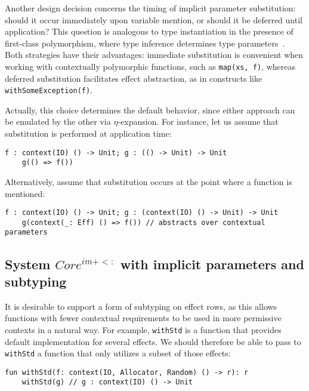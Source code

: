 \documentclass[acmsmall,review,screen]{acmart}
\begin{document}
Another design decision concerns the timing of implicit parameter substitution: should it occur immediately upon variable mention, or should it be deferred until application?
This question is analogous to type instantiation in the presence of first-class polymorphism, where type inference determines type parameters~\cite{emrich2020freezeml}. %
Both strategies have their advantages: immediate substitution is convenient when working with contextually polymorphic functions, such as \texttt{map(xs, f)}, whereas deferred substitution facilitates effect abstraction, as in constructs like \texttt{withSomeException(f)}. %

Actually, this choice determines the default behavior, since either approach can be emulated by the other via $\eta$-expansion.
For instance, let us assume that substitution is performed at application time:
\begin{lstlisting}[language=colang]
    f : context(IO) () -> Unit; g : (() -> Unit) -> Unit
    g(() => f())
\end{lstlisting}
Alternatively, assume that substitution occurs at the point where a function is mentioned:
\begin{lstlisting}[language=colang]
    f : context(IO) () -> Unit; g : (context(IO) () -> Unit) -> Unit
    g(context(_: Eff) () => f()) // abstracts over contextual parameters
\end{lstlisting}


\subsection{System $Core^{im+<:}$ with implicit parameters and subtyping} \label{subsec:im-sub}

It is desirable to support a form of subtyping on effect rows, as this allows functions with fewer contextual requirements to be used in more permissive contexts in a natural way.
For example, \texttt{withStd} is a function that provides default implementation for several effects.
We should therefore be able to pass to \texttt{withStd} a function that only utilizes a subset of those effects:
\begin{lstlisting}[language=colang]
    fun withStd(f: context(IO, Allocator, Random) () -> r): r
    withStd(g) // g : context(IO) () -> Unit
\end{lstlisting}
\end{document}
